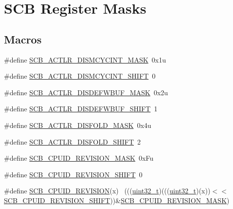 \hypertarget{group___s_c_b___register___masks}{}\section{S\+CB Register Masks}
\label{group___s_c_b___register___masks}
\subsection*{Macros}
\begin{DoxyCompactItemize}
\item 
\#define \hyperlink{group___s_c_b___register___masks_gaae602d6292782f5741df72e5343d314a}{S\+C\+B\+\_\+\+A\+C\+T\+L\+R\+\_\+\+D\+I\+S\+M\+C\+Y\+C\+I\+N\+T\+\_\+\+M\+A\+SK}~0x1u
\item 
\#define \hyperlink{group___s_c_b___register___masks_gaa90446250553adb9c3d3825a1a2d2529}{S\+C\+B\+\_\+\+A\+C\+T\+L\+R\+\_\+\+D\+I\+S\+M\+C\+Y\+C\+I\+N\+T\+\_\+\+S\+H\+I\+FT}~0
\item 
\#define \hyperlink{group___s_c_b___register___masks_ga4c490bd1cf152dfc561b16ecd0c299b9}{S\+C\+B\+\_\+\+A\+C\+T\+L\+R\+\_\+\+D\+I\+S\+D\+E\+F\+W\+B\+U\+F\+\_\+\+M\+A\+SK}~0x2u
\item 
\#define \hyperlink{group___s_c_b___register___masks_gab4462053d8fad6812d5d1ac5c221bfb1}{S\+C\+B\+\_\+\+A\+C\+T\+L\+R\+\_\+\+D\+I\+S\+D\+E\+F\+W\+B\+U\+F\+\_\+\+S\+H\+I\+FT}~1
\item 
\#define \hyperlink{group___s_c_b___register___masks_gaf6db9bf675e72117781be485f701b7d0}{S\+C\+B\+\_\+\+A\+C\+T\+L\+R\+\_\+\+D\+I\+S\+F\+O\+L\+D\+\_\+\+M\+A\+SK}~0x4u
\item 
\#define \hyperlink{group___s_c_b___register___masks_gadd11de163d74ebcd19b1569980c26abc}{S\+C\+B\+\_\+\+A\+C\+T\+L\+R\+\_\+\+D\+I\+S\+F\+O\+L\+D\+\_\+\+S\+H\+I\+FT}~2
\item 
\#define \hyperlink{group___s_c_b___register___masks_ga85fcec5a1a285bf2ead09d715e7fd825}{S\+C\+B\+\_\+\+C\+P\+U\+I\+D\+\_\+\+R\+E\+V\+I\+S\+I\+O\+N\+\_\+\+M\+A\+SK}~0x\+Fu
\item 
\#define \hyperlink{group___s_c_b___register___masks_ga6c4bd208cc5af38612bf38b291f8312d}{S\+C\+B\+\_\+\+C\+P\+U\+I\+D\+\_\+\+R\+E\+V\+I\+S\+I\+O\+N\+\_\+\+S\+H\+I\+FT}~0
\item 
\#define \hyperlink{group___s_c_b___register___masks_gad84b7d9f172bb11a61e873c8316feaac}{S\+C\+B\+\_\+\+C\+P\+U\+I\+D\+\_\+\+R\+E\+V\+I\+S\+I\+ON}(x)                                    ~(((\hyperlink{_p_e___types_8h_a33594304e786b158f3fb30289278f5af}{uint32\+\_\+t})(((\hyperlink{_p_e___types_8h_a33594304e786b158f3fb30289278f5af}{uint32\+\_\+t})(x))$<$$<$\hyperlink{group___s_c_b___register___masks_ga6c4bd208cc5af38612bf38b291f8312d}{S\+C\+B\+\_\+\+C\+P\+U\+I\+D\+\_\+\+R\+E\+V\+I\+S\+I\+O\+N\+\_\+\+S\+H\+I\+FT}))\&\hyperlink{group___s_c_b___register___masks_ga85fcec5a1a285bf2ead09d715e7fd825}{S\+C\+B\+\_\+\+C\+P\+U\+I\+D\+\_\+\+R\+E\+V\+I\+S\+I\+O\+N\+\_\+\+M\+A\+SK})
$$
\end{DoxyCompactItemize}
